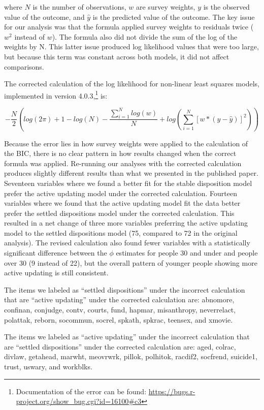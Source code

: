 \documentclass[
]{article}
\begin{document}
where \(N\) is the number of observations, \(w\) are survey weights,
\(y\) is the observed value of the outcome, and \(\hat{y}\) is the
predicted value of the outcome. The key issue for our analysis was that
the formula applied survey weights to residuals twice (\(w^2\) instead
of \(w\)). The formula also did not divide the sum of the log of the
weights by N. This latter issue produced log likelihood values that were
too large, but because this term was constant across both models, it did
not affect comparisons.

The corrected calculation of the log likelihood for non-linear least
squares models, implemented in version 4.0.3,\footnote{Documentation of
  the error can be found:
  \url{https://bugs.r-project.org/show_bug.cgi?id=16100\#c3}} is:

\[ - \frac{N}{2}(log(2\pi) + 1 - log(N) - \frac{\sum_{i=1}^N{log(w)}}{N} + log(\sum_{i=1}^N{[w*(y - \hat{y})]^2})) \]

Because the error lies in how survey weights were applied to the
calculation of the BIC, there is no clear pattern in how results changed
when the correct formula was applied. Re-running our analyses with the
corrected calculation produces slightly different results than what we
presented in the published paper. Seventeen variables where we found a
better fit for the stable disposition model prefer the active updating
model under the corrected calculation. Fourteen variables where we found
that the active updating model fit the data better prefer the settled
dispositions model under the corrected calculation. This resulted in a
net change of three more variables preferring the active updating model
to the settled dispositions model (75, compared to 72 in the original
analysis). The revised calculation also found fewer variables with a
statistically significant difference between the \(\phi\) estimates for
people 30 and under and people over 30 (9 instead of 22), but the
overall pattern of younger people showing more active updating is still
consistent.

The items we labeled as ``settled dispositions'' under the incorrect
calculation that are ``active updating'' under the corrected calculation
are: abnomore, confinan, conjudge, contv, courts, fund, hapmar,
misanthropy, neverrelact, polattak, reborn, socommun, socrel, spkath,
spkrac, teensex, and xmovie.

The items we labeled as ``active updating'' under the incorrect
calculation that are ``settled dispositions'' under the corrected
calculation are: aged, colrac, divlaw, getahead, marwht, meovrwrk,
pillok, polhitok, racdif2, socfrend, suicide1, trust, uswary, and
workblks.
\end{document}
